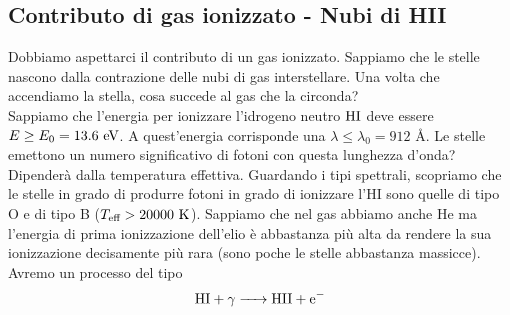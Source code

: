 \subsection*{Contributo di gas ionizzato - Nubi di HII}
Dobbiamo aspettarci il contributo di un gas ionizzato. Sappiamo che le stelle nascono dalla contrazione delle nubi di gas interstellare. Una volta che accendiamo la stella, cosa succede al gas che la circonda?\\
Sappiamo che l'energia per ionizzare l'idrogeno neutro $\ce{HI}$ deve essere $E\ge E_0=13.6\text{ eV}$. A quest'energia corrisponde una $\lambda\le\lambda_0 = 912$ \AA. Le stelle emettono un numero significativo di fotoni con questa lunghezza d'onda? Dipenderà dalla temperatura effettiva. Guardando i tipi spettrali, scopriamo che le stelle in grado di produrre fotoni in grado di ionizzare l'HI sono quelle di tipo O e di tipo B ($T_{\text{eff}}>20000\text{ K}$). Sappiamo che nel gas abbiamo anche He ma l'energia di prima ionizzazione dell'elio è abbastanza più alta da rendere la sua ionizzazione decisamente più rara (sono poche le stelle abbastanza massicce). Avremo un processo del tipo
\[
    \ce{HI + {\gamma}  -> HII + e-}
\]

